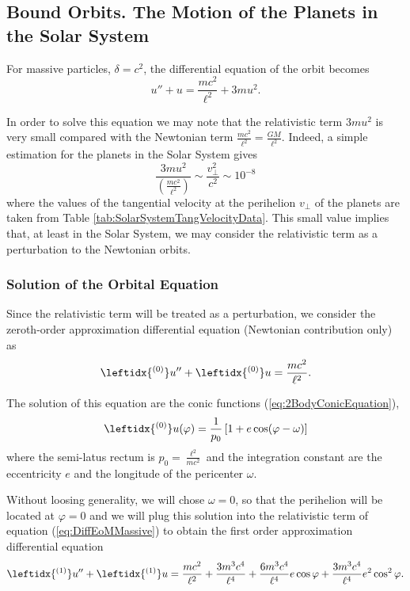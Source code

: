 \subsection{Bound Orbits. The Motion of the Planets in the Solar System}
For massive particles, $\delta=c^2$, the differential equation of the orbit becomes
\begin{equation}
u'' + u = \frac{mc^2}{\ell^2} + 3mu^2 .\label{eq:DiffEoMMassive}
\end{equation}

In order to solve this equation we may note that the relativistic term $3mu^2$ is very small compared with the Newtonian term $\frac{mc^2}{\ell^2} = \frac{GM}{\ell^2}$. Indeed, a simple estimation for the planets in the Solar System gives
\begin{equation}
\frac{3mu^2}{(\frac{mc^2}{\ell^2})} \sim \frac{v_\bot ^2}{c^2} \sim 10^{-8}
\end{equation}
where the values of the tangential velocity at the perihelion $v_\bot$ of the planets are taken from Table \ref{tab:SolarSystemTangVelocityData}. This small value implies that, at least in the Solar System, we may consider the relativistic term as a perturbation to the Newtonian orbits.

\subsubsection{Solution of the Orbital Equation}
Since the relativistic term will be treated as a perturbation, we consider the zeroth-order  approximation differential equation (Newtonian contribution only) as
\begin{equation}
\leftidx{^{(0)}} u''+ \leftidx{^{(0)}}u= \frac{mc^2}{\ell^2}.
\end{equation}

The solution of this equation are the conic functions (\ref{eq:2BodyConicEquation}),
\begin{equation}
\leftidx{^{(0)}} u (\varphi ) = \frac{1}{ p_0  } \left[ 1+ e \cos (\varphi - \omega ) \right]
\end{equation}
where the semi-latus rectum is $p_0 = \frac{\ell^2}{mc^2}$ and the integration constant are the eccentricity $e$ and the longitude of the pericenter $\omega$.  

Without loosing generality, we will chose $\omega=0$, so that the perihelion will be located at $\varphi=0$ and we will plug this solution into the relativistic term of equation (\ref{eq:DiffEoMMassive}) to obtain the first order approximation differential equation
\begin{equation}
\leftidx{^{(1)}} u''+ \leftidx{^{(1)}}u= \frac{mc^2}{\ell^2} + \frac{3m^3 c^4}{\ell^4} + \frac{6m^3 c^4}{\ell^4} e \cos \varphi + \frac{3m^3 c^4}{\ell^4} e^2 \cos^2 \varphi . \label{eq:FirstOrderApproxDiffEoM}
\end{equation}

